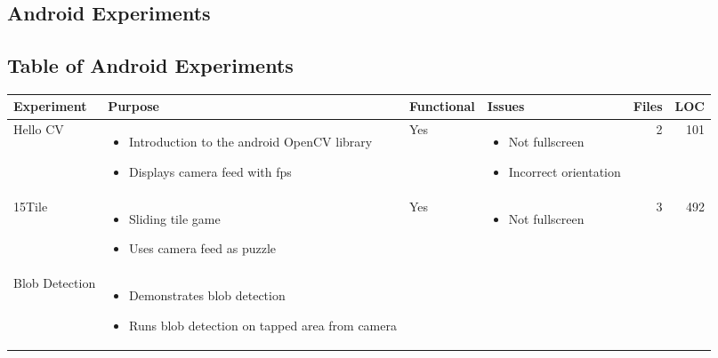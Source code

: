 \appendix
\thispagestyle{empty}
\begin{landscape}
	\section{Android Experiments}\label{app:android_experiments}
		\subsection{Table of Android Experiments}
		\begin{table}[h!]
			\centering
			\label{tab:android_experiments}
			\begin{tabular}{|l|p{0.4\textwidth}|l|p{}|r|r|}
				\hline
				\bfseries Experiment&\bfseries Purpose&\bfseries Functional&\bfseries Issues&\bfseries Files&\bfseries LOC\\
				\hline
				Hello CV&
				\begin{itemize}[noitemsep,topsep=0pt,parsep=0pt]
					\item{Introduction to the android OpenCV library}
					\item{Displays camera feed with fps}
				\end{itemize}&
				Yes&
				\begin{itemize}[noitemsep,topsep=0pt,parsep=0pt]
					\item{Not fullscreen}
					\item{Incorrect orientation}
				\end{itemize}&
				2&
				101\\
				\hline
				15Tile&
				\begin{itemize}[noitemsep,topsep=0pt,parsep=0pt]
					\item{Sliding tile game}
					\item{Uses camera feed as puzzle}
				\end{itemize}&
				Yes&
				\begin{itemize}[noitemsep,topsep=0pt,parsep=0pt]
					\item{Not fullscreen}
				\end{itemize}&
				3&
				492\\
				\hline
				Blob Detection&
				\begin{itemize}[noitemsep,topsep=0pt,parsep=0pt]
					\item{Demonstrates blob detection}
					\item{Runs blob detection on tapped area from camera}
				\end{itemize}&

\end{tabular}
\end{table}
\end{landscape}
